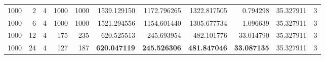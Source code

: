 \begin{table}
\begin{tabular}{rrrrrrrrrrr}
1000 & 2 & 4 & 1000 & 1000 & 1539.129150 & 1172.796265 & 1322.817505 & 0.794298 & 35.327911 & 3 \\
1000 & 6 & 4 & 1000 & 1000 & 1521.294556 & 1154.601440 & 1305.677734 & 1.096639 & 35.327911 & 3 \\
1000 & 12 & 4 & 175 & 235 & 620.525513 & 245.693954 & 482.101776 & 33.014790 & 35.327911 & 3 \\
1000 & 24 & 4 & 127 & 187 & \textbf{620.047119} & \textbf{245.526306} & \textbf{481.847046} & \textbf{33.087135} & 35.327911 & 3 \\
\bottomrule
\end{tabular}
\end{table}

